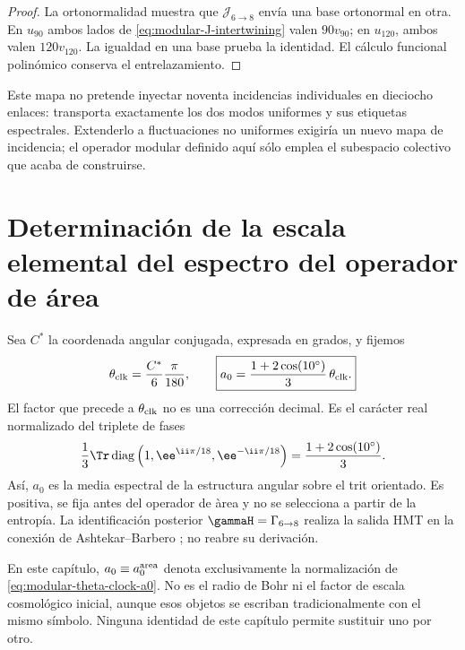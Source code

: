 \begin{proof}
La ortonormalidad muestra que \(\mathcal J_{6\to8}\) env\'ia una base
ortonormal en otra. En \(u_{90}\) ambos lados de
\cref{eq:modular-J-intertwining} valen \(90v_{90}\); en \(u_{120}\),
ambos valen \(120v_{120}\). La igualdad en una base prueba la identidad.
El c\'alculo funcional polin\'omico conserva el entrelazamiento.
\end{proof}

Este mapa no pretende inyectar noventa incidencias individuales en
dieciocho enlaces: transporta exactamente los dos modos uniformes y sus
etiquetas espectrales. Extenderlo a fluctuaciones no uniformes exigir\'ia
un nuevo mapa de incidencia; el operador modular definido aqu\'i s\'olo emplea
el subespacio colectivo que acaba de construirse.

\section{Determinación de la escala elemental del espectro del operador de área}

Sea \(C^*\) la coordenada angular conjugada, expresada en grados, y fijemos
\begin{equation}
\label{eq:modular-theta-clock-a0}
\theta_{\rm clk}=\frac{C^*}{6}\frac{\pi}{180},
\qquad
\boxed{
a_0=\frac{1+2\cos(10^\circ)}{3}\,\theta_{\rm clk}.}
\end{equation}
El factor que precede a \(\theta_{\rm clk}\) no es una correcci\'on
decimal. Es el car\'acter real normalizado del triplete de fases
\begin{equation}
\label{eq:modular-c10-character}
\frac13\Tr\operatorname{diag}
\left(1,\ee^{\ii\pi/18},\ee^{-\ii\pi/18}\right)
=\frac{1+2\cos(10^\circ)}3.
\end{equation}
As\'i, \(a_0\) es la media espectral de la estructura angular sobre el trit
orientado. Es positiva, se fija antes del operador de \`area y no se
selecciona a partir de la entrop\'ia. La identificaci\'on posterior
\(\gammaH=\Gamma_{6\to8}\) realiza la salida HMT en la conexi\'on de
Ashtekar--Barbero \cite{Barbero,Immirzi}; no reabre su derivaci\'on.

\begin{remark}
En este cap\'itulo, \(a_0\equiv a_0^{\rm area}\) denota exclusivamente la
normalizaci\'on de \cref{eq:modular-theta-clock-a0}. No es el radio de Bohr
ni el factor de escala cosmol\'ogico inicial, aunque esos objetos se escriban
tradicionalmente con el mismo s\'imbolo. Ninguna identidad de este cap\'itulo
permite sustituir uno por otro.
\end{remark}
